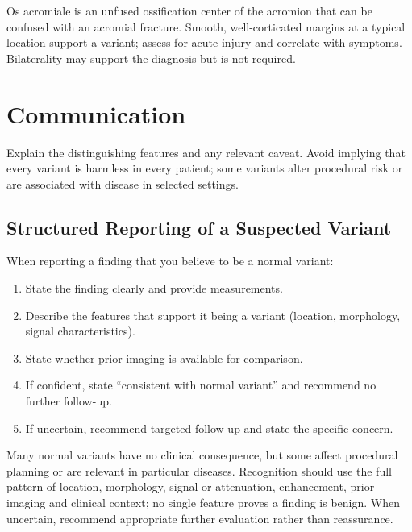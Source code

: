 \begin{pearlbox}
Os acromiale is an unfused ossification center of the acromion that can be confused with an acromial fracture. Smooth, well-corticated margins at a typical location support a variant; assess for acute injury and correlate with symptoms. Bilaterality may support the diagnosis but is not required.
\end{pearlbox}

\section{Communication}
Explain the distinguishing features and any relevant caveat. Avoid implying that every variant is harmless in every patient; some variants alter procedural risk or are associated with disease in selected settings.

\subsection{Structured Reporting of a Suspected Variant}
When reporting a finding that you believe to be a normal variant:
\begin{enumerate}
    \item State the finding clearly and provide measurements.
    \item Describe the features that support it being a variant (location, morphology, signal characteristics).
    \item State whether prior imaging is available for comparison.
    \item If confident, state ``consistent with normal variant'' and recommend no further follow-up.
    \item If uncertain, recommend targeted follow-up and state the specific concern.
\end{enumerate}

\begin{pearlbox}[Impression:]
Many normal variants have no clinical consequence, but some affect procedural planning or are relevant in particular diseases. Recognition should use the full pattern of location, morphology, signal or attenuation, enhancement, prior imaging and clinical context; no single feature proves a finding is benign. When uncertain, recommend appropriate further evaluation rather than reassurance.
\end{pearlbox}

\clearpage
